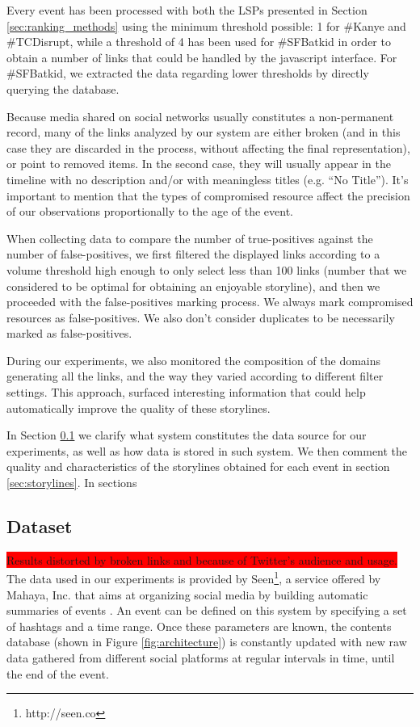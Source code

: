 \documentclass{sig-alternate}
\newcommand{\todo}[1]{\colorbox{red}{#1}}
\begin{document}
Every event has been processed with both the LSPs presented in Section \ref{sec:ranking_methods} using the minimum threshold possible: 1 for \#Kanye and \#TCDisrupt, while a threshold of 4 has been used for \#SFBatkid in order to obtain a number of links that could be handled by the javascript interface. For \#SFBatkid, we extracted the data regarding lower thresholds by directly querying the database.

Because media shared on social networks usually constitutes a non-permanent record, many of the links analyzed by our system are either broken (and in this case they are discarded in the process, without affecting the final representation), or point to removed items. In the second case, they will usually appear in the timeline with no description and/or with meaningless titles (e.g. ``No Title''). It's important to mention that the types of compromised resource affect the precision of our observations proportionally to the age of the event.

When collecting data to compare the number of true-positives against the number of false-positives, we first filtered the displayed links according to a volume threshold high enough to only select less than 100 links (number that we considered to be optimal for obtaining an enjoyable storyline), and then we proceeded with the false-positives marking process. We always mark compromised resources as false-positives. We also don't consider duplicates to be necessarily marked as false-positives.

During our experiments, we also monitored the composition of the domains generating all the links, and the way they varied according to different filter settings. This approach, surfaced interesting information that could help automatically improve the quality of these storylines.

In Section \ref{sec:dataset} we clarify what system constitutes the data source for our experiments, as well as how data is stored in such system. We then comment the quality and characteristics of the storylines obtained for each event in section \ref{sec:storylines}. In sections 

\subsection{Dataset}
\label{sec:dataset}
\todo{Results distorted by broken links and because of Twitter's audience and usage.}
The data used in our experiments is provided by Seen\footnote{http://seen.co}, a service offered by Mahaya, Inc. that aims at organizing social media by building automatic summaries of events \cite{SeenWired}. An event can be defined on this system by specifying a set of hashtags and a time range. Once these parameters are known, the contents database (shown in Figure \ref{fig:architecture}) is constantly updated with new raw data gathered from different social platforms at regular intervals in time, until the end of the event.
\end{document}
